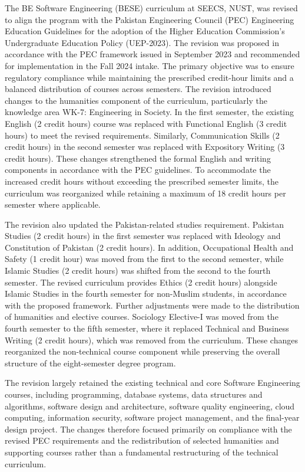 The BE Software Engineering (BESE) curriculum at SEECS, NUST, was revised to align the program with the Pakistan Engineering Council (PEC) Engineering Education Guidelines for the adoption of the Higher Education Commission’s Undergraduate Education Policy (UEP-2023). The revision was proposed in accordance with the PEC framework issued in September 2023 and recommended for implementation in the Fall 2024 intake. The primary objective was to ensure regulatory compliance while maintaining the prescribed credit-hour limits and a balanced distribution of courses across semesters. The revision introduced changes to the humanities component of the curriculum, particularly the knowledge area WK-7: Engineering in Society. In the first semester, the existing English (2 credit hours) course was replaced with Functional English (3 credit hours) to meet the revised requirements. Similarly, Communication Skills (2 credit hours) in the second semester was replaced with Expository Writing (3 credit hours). These changes strengthened the formal English and writing components in accordance with the PEC guidelines. To accommodate the increased credit hours without exceeding the prescribed semester limits, the curriculum was reorganized while retaining a maximum of 18 credit hours per semester where applicable.

The revision also updated the Pakistan-related studies requirement. Pakistan Studies (2 credit hours) in the first semester was replaced with Ideology and Constitution of Pakistan (2 credit hours). In addition, Occupational Health and Safety (1 credit hour) was moved from the first to the second semester, while Islamic Studies (2 credit hours) was shifted from the second to the fourth semester. The revised curriculum provides Ethics (2 credit hours) alongside Islamic Studies in the fourth semester for non-Muslim students, in accordance with the proposed framework. Further adjustments were made to the distribution of humanities and elective courses. Sociology Elective-I was moved from the fourth semester to the fifth semester, where it replaced Technical and Business Writing (2 credit hours), which was removed from the curriculum. These changes reorganized the non-technical course component while preserving the overall structure of the eight-semester degree program.

The revision largely retained the existing technical and core Software Engineering courses, including programming, database systems, data structures and algorithms, software design and architecture, software quality engineering, cloud computing, information security, software project management, and the final-year design project. The changes therefore focused primarily on compliance with the revised PEC requirements and the redistribution of selected humanities and supporting courses rather than a fundamental restructuring of the technical curriculum.

